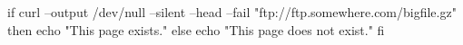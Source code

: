 if curl --output /dev/null --silent --head --fail "ftp://ftp.somewhere.com/bigfile.gz"
then
  echo "This page exists."
 else
  echo "This page does not exist."
fi